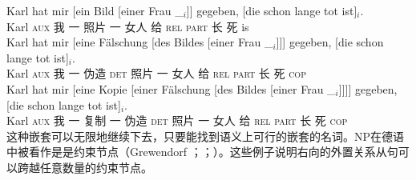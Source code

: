 \eal
\ex 
\gll Karl hat mir [ein Bild [einer Frau \_$_i$]] gegeben, [die schon lange tot ist]$_i$.\\
     Karl \textsc{aux} 我  \spacebr{}一 照片  \spacebr{}一 女人 {} 给 \spacebr{}\textsc{rel} \textsc{part} 长 死 is\\
\ex 
\gll Karl hat          mir [eine Fälschung [des Bildes                 [einer Frau \_$_i$]]] gegeben, [die schon lange tot ist]$_i$.\\
     Karl \textsc{aux} 我  \spacebr{}一 伪造 \spacebr{}\textsc{det} 照片 \spacebr{}一 女人 {} 给 \spacebr{}\textsc{rel} \textsc{part} 长 死 \textsc{cop}\\
\ex 
\gll Karl hat mir [eine Kopie [einer Fälschung [des Bildes [einer Frau \_$_i$]]]] gegeben, [die schon lange tot ist]$_i$.\\
	 Karl \textsc{aux} 我 \spacebr{}一 复制 \spacebr{}一 伪造 \spacebr{}\textsc{det} 照片 \spacebr{}一 女人 {} 给 \spacebr{}\textsc{rel} \textsc{part} 长 死 \textsc{cop}\\
\zl
这种嵌套可以无限地继续下去，只要能找到语义上可行的嵌套的名词。NP在德语中被看作是是约束节点（Grewendorf \citeyear[]{Grewendorf88a}；\citeyear[--18]{Grewendorf2002a}；\citealp[]{Haider2001a}）。这些例子说明右向的外置关系从句可以跨越任意数量的约束节点。

